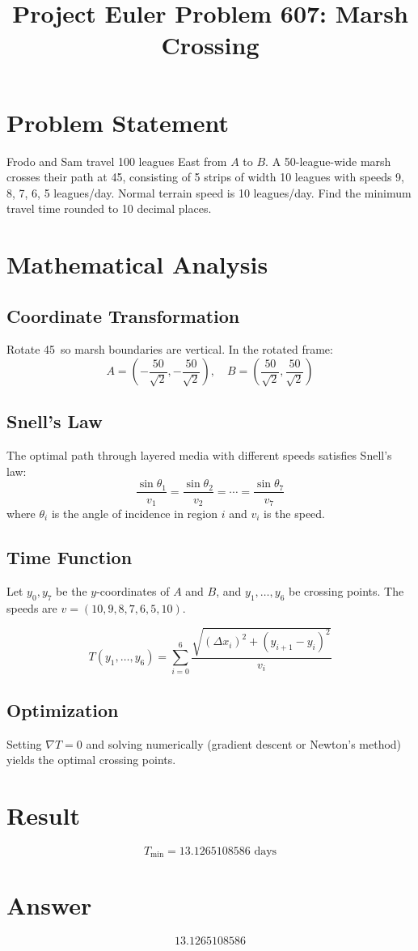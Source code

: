 \documentclass[12pt]{article}
\title{Project Euler Problem 607: Marsh Crossing}
\author{}
\date{}
\begin{document}
\maketitle

\section{Problem Statement}
Frodo and Sam travel 100 leagues East from $A$ to $B$. A 50-league-wide marsh crosses their path at 45\textdegree, consisting of 5 strips of width 10 leagues with speeds 9, 8, 7, 6, 5 leagues/day. Normal terrain speed is 10 leagues/day. Find the minimum travel time rounded to 10 decimal places.

\section{Mathematical Analysis}

\subsection{Coordinate Transformation}
Rotate 45\textdegree\ so marsh boundaries are vertical. In the rotated frame:
\[
A = \left(-\frac{50}{\sqrt{2}}, -\frac{50}{\sqrt{2}}\right), \quad
B = \left(\frac{50}{\sqrt{2}}, \frac{50}{\sqrt{2}}\right)
\]

\subsection{Snell's Law}
The optimal path through layered media with different speeds satisfies Snell's law:
\[
\frac{\sin\theta_1}{v_1} = \frac{\sin\theta_2}{v_2} = \cdots = \frac{\sin\theta_7}{v_7}
\]
where $\theta_i$ is the angle of incidence in region $i$ and $v_i$ is the speed.

\subsection{Time Function}
Let $y_0, y_7$ be the $y$-coordinates of $A$ and $B$, and $y_1, \ldots, y_6$ be crossing points. The speeds are $v = (10, 9, 8, 7, 6, 5, 10)$.

\[
T(y_1, \ldots, y_6) = \sum_{i=0}^{6} \frac{\sqrt{(\Delta x_i)^2 + (y_{i+1} - y_i)^2}}{v_i}
\]

\subsection{Optimization}
Setting $\nabla T = 0$ and solving numerically (gradient descent or Newton's method) yields the optimal crossing points.

\section{Result}
\[
T_{\min} = \boxed{13.1265108586} \text{ days}
\]

\section{Answer}

\[
\boxed{13.1265108586}
\]
\end{document}
